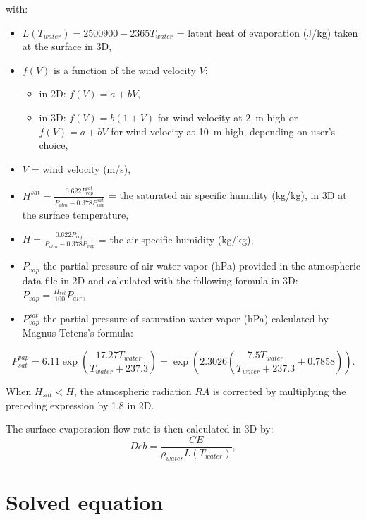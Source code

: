 with:
\begin{itemize}
  \item $L(T_{water}) = 2500900 - 2365 T_{water}$ = latent heat of evaporation (J/kg)
    taken at the surface in 3D,
  \item $f(V)$ is a function of the wind velocity $V$:
    \begin{itemize}
      \item in 2D: $f(V) = a+bV$,
      \item in 3D: $f(V) = b(1+V)$ for wind velocity at 2~m high
        or $f(V) = a+bV$ for wind velocity at 10~m high,
        depending on user's choice,
    \end{itemize}
  \item $V$ = wind velocity (m/s),
  \item $H^{sat} = \frac{0.622 P_{vap}^{sat}}{P_{atm}-0.378 P_{vap}^{sat}}$
    = the saturated air specific humidity (kg/kg),
    in 3D at the surface temperature,
  \item $H = \frac{0.622 P_{vap}}{P_{atm}-0.378 P_{vap}}$
    = the air specific humidity (kg/kg),
  \item $P_{vap}$ the partial pressure of air water vapor (hPa)
    provided in the atmospheric data file in 2D
    and calculated with the following formula in 3D:
    $P_{vap} = \frac{H_{rel}}{100} P_{air}$,
  \item  $P_{vap}^{sat}$ the partial pressure of saturation water vapor (hPa)
    calculated by Magnus-Tetens's formula:
\end{itemize}

\begin{equation}
  P_{sat}^{vap} = 6.11 \exp \left( \frac{17.27 T_{water}}{T_{water} + 237.3} \right)
  = \exp \left( 2.3026 \left( \frac{7.5 T_{water}}{T_{water} + 237.3} + 0.7858 \right) \right).
\end{equation}

When $H_{sat} < H$, the atmospheric radiation $RA$ is corrected
by multiplying the preceding expression by 1.8 in 2D.

The surface evaporation flow rate is then calculated in 3D by:
\begin{equation}
Deb = \frac{CE}{\rho_{water}L(T_{water})},
\end{equation}

\section{Solved equation}

